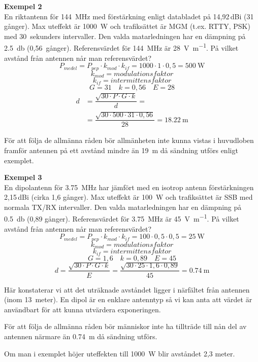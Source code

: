 \begin{exempelbox}
\textbf{Exempel 2} \\
En riktantenn för \qty{144}{\mega\hertz} med förstärkning enligt databladet på
14,92\,dBi (31 gånger).
Max uteffekt är \qty{1000}{\watt} och trafiksättet är MGM (t.ex. RTTY, PSK) med
30~sekunders intervaller.
Den valda matarledningen har en dämpning på \qty{2,5}{\decibel} (0,56~gånger).
Referensvärdet för \qty{144}{\mega\hertz} är \qty{28}{\volt\per\metre}.
På vilket avstånd från antennen når man referensvärdet?
\tcblower
\noindent
\[P_{medel} = P_{pep} \cdot k_{mod} \cdot k_{if}
= 1000 \cdot 1 \cdot 0,5 = \qty{500}{\watt}\]
\[k_{mod} = \textit{modulationsfaktor}\]
\[k_{if} = \textit{intermittensfaktor}\]
\[G = 31 \quad k = 0,56 \quad E = 28\]
\begin{align*}
  d &= \dfrac{\sqrt{30 \cdot P \cdot G \cdot k}}{d} =\\
&= \dfrac{\sqrt{30 \cdot 500 \cdot 31 \cdot 0,56}}{28}
  = \qty{18,22}{\metre}
  \end{align*}

För att följa de allmänna råden bör allmänheten inte kunna vistas i huvudloben
framför antennen på ett avstånd mindre än \qty{19}{\metre} då sändning utförs
enligt exemplet.
\end{exempelbox}

\begin{exempelbox}
\textbf{Exempel 3} \\
En dipolantenn för \qty{3,75}{\mega\hertz} har jämfört med en isotrop antenn
förstärkningen 2,15\,dBi (cirka 1,6 gånger).
Max uteffekt är \qty{100}{\watt} och trafiksättet är SSB med normala TX/RX
intervaller.
Den valda matarledningen har en dämpning på \qty{0,5}{\decibel} (0,89 gånger).
Referensvärdet för \qty{3,75}{\mega\hertz} är \qty{45}{\volt\per\metre}.
På vilket avstånd från antennen når man referensvärdet?
\tcblower
\noindent
\[P_{medel} = P_{pep} \cdot k_{mod} \cdot k_{if}
= 100 \cdot 0,5 \cdot 0,5 = \qty{25}{\watt}\]
\[k_{mod} = modulationsfaktor\]
\[k_{if} = intermittensfaktor\]
\[G = 1,6 \quad k = 0,89 \quad E = 45\]
\[d = \dfrac{\sqrt{30 \cdot P \cdot G \cdot k}}{E} = \dfrac{\sqrt{30 \cdot 25 \cdot 1,6 \cdot 0,89}}{45}
= \qty{0,74}{\metre}\]

Här konstaterar vi att det uträknade avståndet ligger i närfältet från antennen
(inom 13~meter).
En dipol är en enklare antenntyp så vi kan anta att värdet är användbart för att
kunna utvärdera exponeringen.

För att följa de allmänna råden bör människor inte ha tillträde till nån del av
antennen närmare än \qty{0,74}{\metre} då sändning utförs.

Om man i exemplet höjer uteffekten till \qty{1000}{\watt} blir avståndet 2,3
meter.
\end{exempelbox}
